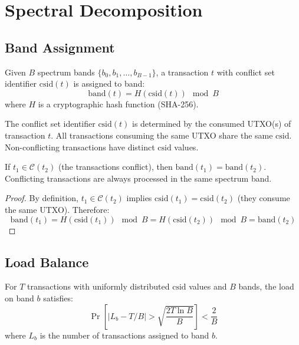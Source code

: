 \section{Spectral Decomposition}

\label{sec:prism-partition}

\subsection{Band Assignment}

\begin{definition}
Given $B$ spectrum bands $\{b_0, b_1, \ldots, b_{B-1}\}$, a transaction $t$ with
conflict set identifier $\text{csid}(t)$ is assigned to band:
\[
\text{band}(t) = H(\text{csid}(t)) \mod B
\]
where $H$ is a cryptographic hash function (SHA-256).
\end{definition}

\begin{definition}
The conflict set identifier $\text{csid}(t)$ is determined by the consumed UTXO(s)
of transaction $t$. All transactions consuming the same UTXO share the same $\text{csid}$.
Non-conflicting transactions have distinct $\text{csid}$ values.
\end{definition}

\begin{theorem}
\label{thm:prism-locality}
If $t_1 \in \mathcal{C}(t_2)$ (the transactions conflict), then $\text{band}(t_1) = \text{band}(t_2)$.
Conflicting transactions are always processed in the same spectrum band.
\end{theorem}

\begin{proof}
By definition, $t_1 \in \mathcal{C}(t_2)$ implies $\text{csid}(t_1) = \text{csid}(t_2)$
(they consume the same UTXO). Therefore:
\[
\text{band}(t_1) = H(\text{csid}(t_1)) \mod B = H(\text{csid}(t_2)) \mod B = \text{band}(t_2)
\]
\end{proof}

\subsection{Load Balance}

\begin{theorem}
\label{thm:prism-balance}
For $T$ transactions with uniformly distributed $\text{csid}$ values and $B$ bands,
the load on band $b$ satisfies:
\[
\Pr\left[|L_b - T/B| > \sqrt{\frac{2T \ln B}{B}}\right] < \frac{2}{B}
\]
where $L_b$ is the number of transactions assigned to band $b$.
\end{theorem}

